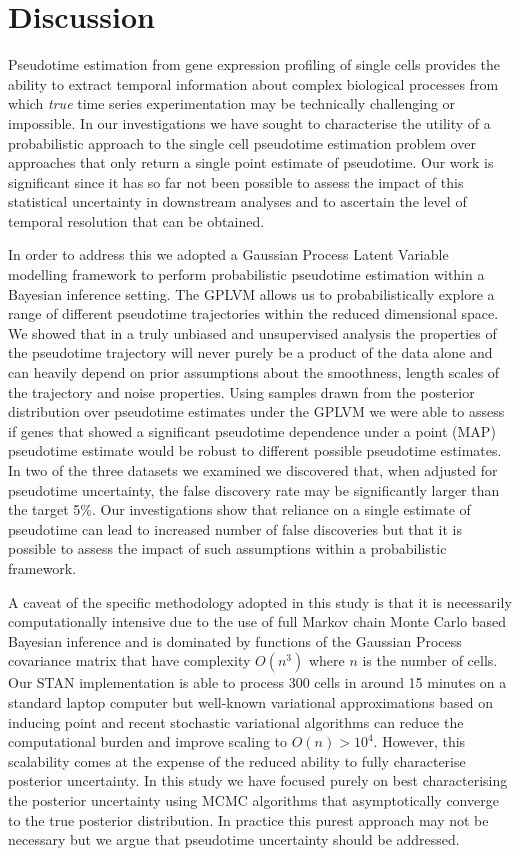 \section{Discussion}

Pseudotime estimation from gene expression profiling of single cells provides the ability to extract temporal information about complex biological processes from which \emph{true} time series experimentation may be technically challenging or impossible. In our investigations we have sought to characterise the utility of a probabilistic approach to the single cell pseudotime estimation problem over approaches that only return a single point estimate of pseudotime. Our work is significant since it has so far not been possible to assess the impact of this statistical uncertainty in downstream analyses and to ascertain the level of temporal resolution that can be obtained.

In order to address this we adopted a Gaussian Process Latent Variable modelling framework to perform probabilistic pseudotime estimation within a Bayesian inference setting. The GPLVM allows us to probabilistically explore a range of different pseudotime trajectories within the reduced dimensional space. We showed that in a truly unbiased and unsupervised analysis the properties of the pseudotime trajectory will never purely be a product of the data alone and can heavily depend on prior assumptions about the smoothness, length scales of the trajectory and noise properties. Using  samples drawn from the posterior distribution over pseudotime estimates under the GPLVM we were able to assess if genes that showed a significant pseudotime dependence under a point (MAP) pseudotime estimate would be robust to different possible pseudotime estimates. In two of the three datasets we examined we discovered that, when adjusted for pseudotime uncertainty, the false discovery rate may be significantly larger than the target 5\%. Our investigations show that reliance on a single estimate of pseudotime can lead to increased number of false discoveries but that it is possible to assess the impact of such assumptions within a probabilistic framework.

A caveat of the specific methodology adopted in this study is that it is necessarily computationally intensive due to the use of full Markov chain Monte Carlo based Bayesian inference and is dominated by functions of the Gaussian Process covariance matrix that have complexity $O(n^3)$ where $n$ is the number of cells. Our STAN implementation is able to process 300 cells in around 15 minutes on a standard laptop computer but well-known variational approximations based on inducing point \cite{titsias2009variational} and recent stochastic variational algorithms \cite{hensman2013gaussian} can reduce the computational burden and improve scaling to $O(n) > 10^4$. However, this scalability comes at the expense of the reduced ability to fully characterise posterior uncertainty. In this study we have focused purely on best characterising the posterior uncertainty using MCMC algorithms that asymptotically converge to the true posterior distribution. In practice this purest approach may not be necessary but we argue that pseudotime uncertainty should be addressed.

